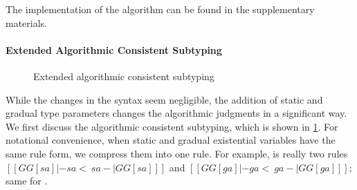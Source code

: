 The implementation of the algorithm can be found in the supplementary materials.


\paragraph{Extended Algorithmic Consistent Subtyping}


\begin{figure}[t]
  \centering
  \begin{small}
  \end{small}
  \caption{Extended algorithmic consistent subtyping}
  \label{fig:exd:algo:sub}
\end{figure}

While the changes in the syntax seem negligible, the addition of static and
gradual type parameters changes the algorithmic judgments in a significant way.
We first discuss the algorithmic consistent subtyping, which is shown in \cref{fig:exd:algo:sub}.
For notational convenience, when static and
gradual existential variables have the same rule form, we compress them into one rule. For
example,  is really two rules $[[ GG[sa] |- sa <~ sa -| GG[sa] ]]$
and $[[ GG[ga] |- ga <~ ga -| GG[ga] ]]$; same for .

